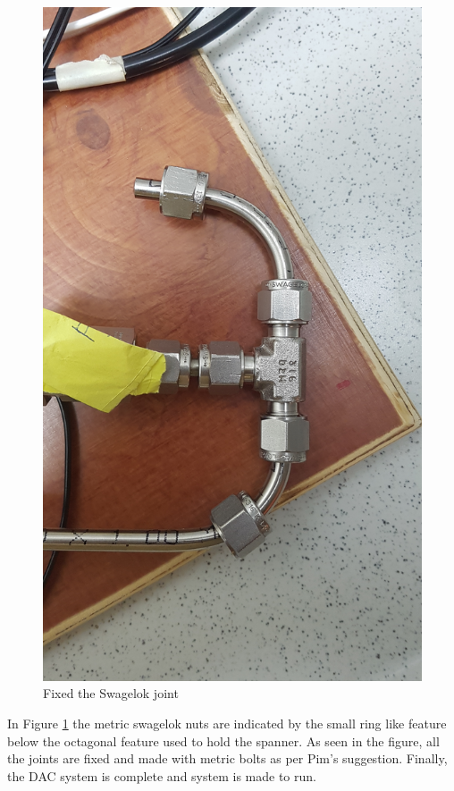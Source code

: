 \begin{figure}[H]
    \centering
    \includegraphics[scale = 0.07]{images/mywork/Sprint2/swagelok.jpg}
    \caption{Fixed the Swagelok joint}
    \label{fig:swagiss}
\end{figure}

In Figure \ref{fig:swagiss} the metric swagelok nuts are indicated by the small ring like feature below the octagonal feature used to hold the spanner. As seen in the figure, all the joints are fixed and made with metric bolts as per Pim's suggestion. Finally, the DAC system is complete and system is made to run. 

